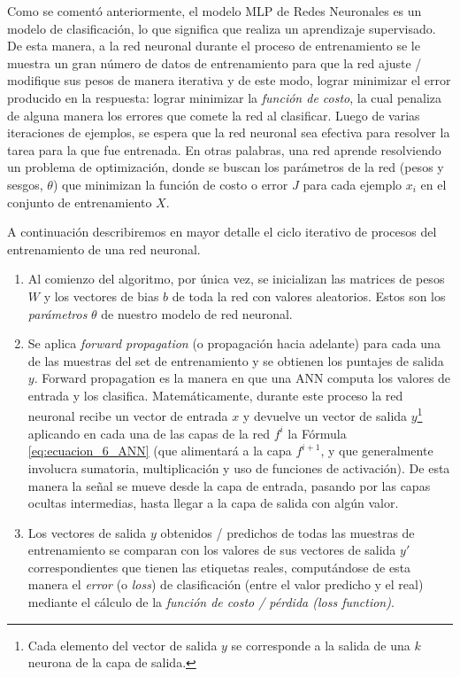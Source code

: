 \documentclass[12pt,a4paper]{article}
\begin{document}
\begin{sloppypar}
Como se comentó anteriormente, el modelo MLP de Redes Neuronales es un modelo de clasificación, lo que significa que realiza un aprendizaje supervisado. De esta manera, a la red neuronal durante el proceso de entrenamiento se le muestra un gran número de datos de entrenamiento para que la red ajuste / modifique sus pesos de manera iterativa y de este modo, lograr minimizar el error producido en la respuesta: lograr minimizar la \textit{función de costo}, la cual penaliza de alguna manera los errores que comete la red al clasificar. Luego de varias iteraciones de ejemplos, se espera que la red neuronal sea efectiva para resolver la tarea para la que fue entrenada.
En otras palabras, una red aprende resolviendo un problema de optimización, donde se buscan los parámetros de la red (pesos y sesgos, $\theta$) que minimizan la función de costo o error $J$ para cada ejemplo $x_i$ en el conjunto de entrenamiento $X$. 

A continuación describiremos en mayor detalle el ciclo iterativo de procesos del entrenamiento de una red neuronal\cite{ANN_25}.

\begin{enumerate}
\item Al comienzo del algoritmo, por única vez, se inicializan las matrices de pesos $W$ y los vectores de bias $b$ de toda la red con valores aleatorios. Estos son los \textit{parámetros} $\theta$ de nuestro modelo de red neuronal.
  
\item Se aplica \textit{forward propagation} (o propagación hacia adelante) para cada una de las muestras del set de entrenamiento y se obtienen los puntajes de salida $y$. Forward propagation es la manera en que una ANN computa los valores de entrada y los clasifica. Matemáticamente, durante este proceso la red neuronal recibe un vector de entrada $x$ y devuelve un vector de salida $y$\footnote{Cada elemento del vector de salida $y$ se corresponde a la salida de una $k$ neurona de la capa de salida.} aplicando en cada una de las capas de la red $f^{i}$ la Fórmula \ref{eq:ecuacion_6_ANN} (que alimentará a la capa $f^{i+1}$, y que generalmente involucra sumatoria, multiplicación y uso de funciones de activación). De esta manera la señal se mueve desde la capa de entrada, pasando por las capas ocultas intermedias, hasta llegar a la capa de salida con algún valor.

\item Los vectores de salida $y$ obtenidos / predichos de todas las muestras de entrenamiento se comparan con los valores de sus vectores de salida $y'$ correspondientes que tienen las etiquetas reales, computándose de esta manera el \textit{error} (o \textit{loss}) de clasificación (entre el valor predicho y el real) mediante el cálculo de la \textit{función de costo / pérdida (loss function)}.


\end{enumerate}
\end{sloppypar}
\end{document}
